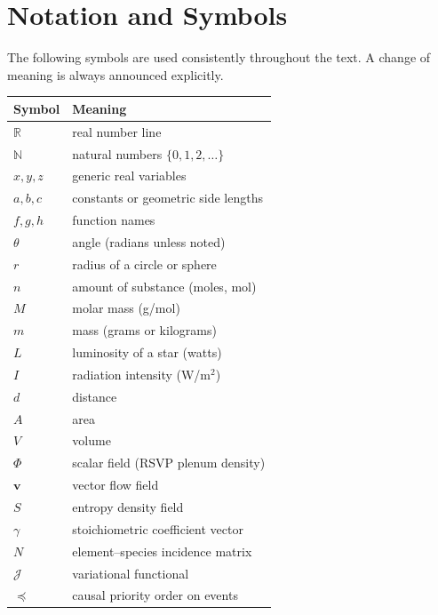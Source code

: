 \documentclass[11pt, openany]{book}
\theoremstyle{plain}
\theoremstyle{definition}
\theoremstyle{remark}
\newcommand{\R}{\mathbb{R}}
\newcommand{\N}{\mathbb{N}}
\begin{document}
\chapter*{Notation and Symbols}

The following symbols are used consistently throughout the text.
A change of meaning is always announced explicitly.

\begin{center}
\renewcommand{\arraystretch}{1.55}
\begin{tabular}{>{\bfseries}p{2.2cm} p{10cm}}
\toprule
Symbol & Meaning \\
\midrule
$\R$       & real number line \\
$\N$       & natural numbers $\{0,1,2,\dots\}$ \\
$x,y,z$    & generic real variables \\
$a,b,c$    & constants or geometric side lengths \\
$f,g,h$    & function names \\
$\theta$   & angle (radians unless noted) \\
$r$        & radius of a circle or sphere \\
$n$        & amount of substance (moles, mol) \\
$M$        & molar mass (g/mol) \\
$m$        & mass (grams or kilograms) \\
$L$        & luminosity of a star (watts) \\
$I$        & radiation intensity (W/m$^2$) \\
$d$        & distance \\
$A$        & area \\
$V$        & volume \\
$\Phi$     & scalar field (RSVP plenum density) \\
$\mathbf{v}$ & vector flow field \\
$S$        & entropy density field \\
$\gamma$   & stoichiometric coefficient vector \\
$N$        & element--species incidence matrix \\
$\mathcal{J}$ & variational functional \\
$\preceq$  & causal priority order on events \\
\bottomrule
\end{tabular}
\end{center}
\end{document}
